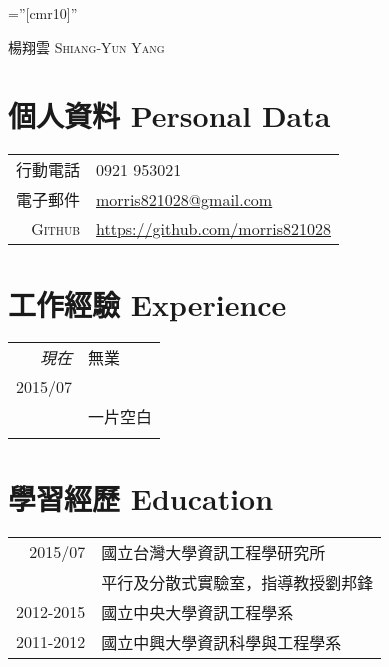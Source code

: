 \documentclass[a4paper,10pt]{article}
\begin{document}

\pagestyle{empty} %

\font\fb=''[cmr10]'' %

\par{\centering
		{\Huge 楊翔雲 \textsc{Shiang-Yun Yang}
	}\bigskip\par}

\section{個人資料 Personal Data}

\begin{tabular}{rl}
    \textsc{行動電話} & 0921 953021\\
    \textsc{電子郵件} & \href{mailto:morris821028@gmail.com}{morris821028@gmail.com} \\
    \textsc{Github}  & \url{https://github.com/morris821028}
\end{tabular}

\section{工作經驗 Experience}
\begin{tabular}{r|p{11cm}}
 \emph{現在} & 無業 \\\textsc{2015/07}& \emph{}\\&\footnotesize{一片空白}\\\multicolumn{2}{c}{} \\
 
\end{tabular}

\section{學習經歷 Education}
\begin{tabular}{rl}	
	2015/07 & 國立台灣大學資訊工程學研究所 \\
		& 平行及分散式實驗室，指導教授劉邦鋒 \\
	2012-2015 & 國立中央大學資訊工程學系 \\
	2011-2012 & 國立中興大學資訊科學與工程學系 \\
\end{tabular}
\end{document}
